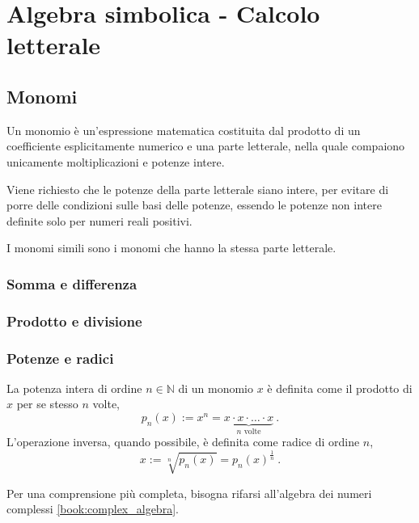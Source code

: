 
\chapter{Algebra simbolica - Calcolo letterale}

\section{Monomi}
\begin{definition}[Monomio] Un monomio è un'espressione matematica costituita dal prodotto di un coefficiente esplicitamente numerico e una parte letterale, nella quale compaiono unicamente moltiplicazioni e potenze intere.
\end{definition}
\begin{remark} Viene richiesto che le potenze della parte letterale siano intere, per evitare di porre delle condizioni sulle basi delle potenze, essendo le potenze non intere definite solo per numeri reali positivi.
\end{remark}

\begin{definition} I monomi simili sono i monomi che hanno la stessa parte letterale.
\end{definition}

\subsection{Somma e differenza}
\subsection{Prodotto e divisione}
\subsection{Potenze e radici}
\begin{definition} La potenza intera di ordine $n \in \mathbb{N}$ di un monomio $x$ è definita come il prodotto di $x$ per se stesso $n$ volte,
\begin{equation}
  p_n(x) := x^n = \underbrace{x \cdot x \cdot \dots \cdot x}_{\text{$n$ volte}} \ .
\end{equation}
L'operazione inversa, quando possibile, è definita come radice di ordine $n$,
\begin{equation}
  x := \sqrt[n]{p_n(x)} = p_n(x)^{\frac{1}{n}} \ .
\end{equation}
\end{definition}
\begin{remark} Per una comprensione più completa, bisogna rifarsi all'algebra dei numeri complessi \ref{book:complex_algebra}.
\end{remark}

